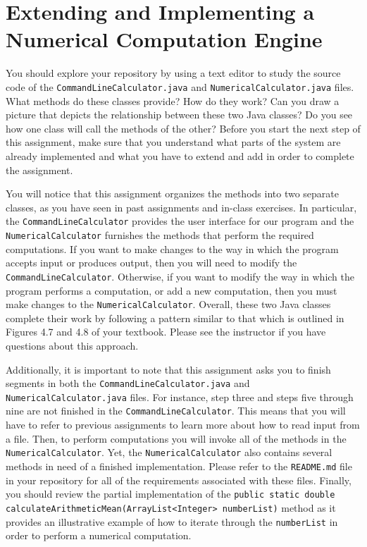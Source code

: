 \documentclass[11pt]{article}
\newcommand{\mainprogram}{\lstinline{CommandLineCalculator}}
\newcommand{\secondprogram}{\lstinline{NumericalCalculator}}
\newcommand{\readme}{\lstinline{README.md}}
\newcommand{\program}[1]{\lstinline{#1}}
\begin{document}
\section*{Extending and Implementing a Numerical Computation Engine}

You should explore your repository by using a text editor to study the source
code of the {\tt CommandLineCalculator.java} and {\tt NumericalCalculator.java}
files. What methods do these classes provide? How do they work? Can you draw a
picture that depicts the relationship between these two Java classes? Do you see
how one class will call the methods of the other? Before you start the next step
of this assignment, make sure that you understand what parts of the system are
already implemented and what you have to extend and add in order to complete the
assignment.

You will notice that this assignment organizes the methods into two separate
classes, as you have seen in past assignments and in-class exercises. In
particular, the {\tt CommandLineCalculator} provides the user interface for our
program and the {\tt NumericalCalculator} furnishes the methods that perform the
required computations. If you want to make changes to the way in which the
program accepts input or produces output, then you will need to modify the {\tt
CommandLineCalculator}. Otherwise, if you want to modify the way in which the
program performs a computation, or add a new computation, then you must make
changes to the {\tt NumericalCalculator}. Overall, these two Java classes
complete their work by following a pattern similar to that which is outlined in
Figures 4.7 and 4.8 of your textbook. Please see the instructor if you have
questions about this approach.

Additionally, it is important to note that this assignment asks you to finish
segments in both the {\tt CommandLineCalculator.java} and {\tt
NumericalCalculator.java} files. For instance, step three and steps five through
nine are not finished in the \mainprogram{}. This means that you will have to
refer to previous assignments to learn more about how to read input from a file.
Then, to perform computations you will invoke all of the methods in the
\secondprogram{}. Yet, the \secondprogram{} also contains several methods in
need of a finished implementation. Please refer to the \readme{} file in your
repository for all of the requirements associated with these files. Finally, you
should review the partial implementation of the \program{public static double
calculateArithmeticMean(ArrayList<Integer> numberList)} method as it provides an
illustrative example of how to iterate through the \program{numberList} in order
to perform a numerical computation.
\end{document}
